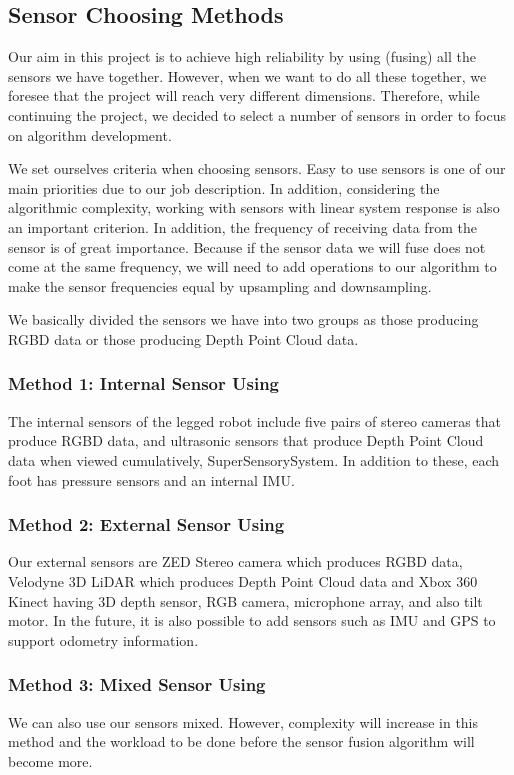 \documentclass[12pt]{article}
\begin{document}
\subsection{Sensor Choosing Methods}

Our aim in this project is to achieve high reliability by using (fusing) all the sensors we have together. However, when we want to do all these together, we foresee that the project will reach very different dimensions. Therefore, while continuing the project, we decided to select a number of sensors in order to focus on algorithm development.

We set ourselves criteria when choosing sensors. Easy to use sensors is one of our main priorities due to our job description. In addition, considering the algorithmic complexity, working with sensors with linear system response is also an important criterion. In addition, the frequency of receiving data from the sensor is of great importance. Because if the sensor data we will fuse does not come at the same frequency, we will need to add operations to our algorithm to make the sensor frequencies equal by upsampling and downsampling.

We basically divided the sensors we have into two groups as those producing RGBD data or those producing Depth Point Cloud data.

\subsubsection{Method 1: Internal Sensor Using}
The internal sensors of the legged robot include five pairs of stereo cameras that produce RGBD data, and ultrasonic sensors that produce Depth Point Cloud data when viewed cumulatively, SuperSensorySystem. In addition to these, each foot has pressure sensors and an internal IMU.

\subsubsection{Method 2: External Sensor Using}
Our external sensors are ZED Stereo camera which produces RGBD data, Velodyne 3D LiDAR which produces Depth Point Cloud data and Xbox 360 Kinect having 3D depth sensor, RGB camera, microphone array, and also tilt motor. In the future, it is also possible to add sensors such as IMU and GPS to support odometry information.

\subsubsection{Method 3: Mixed Sensor Using}
We can also use our sensors mixed. However, complexity will increase in this method and the workload to be done before the sensor fusion algorithm will become more.
\end{document}
